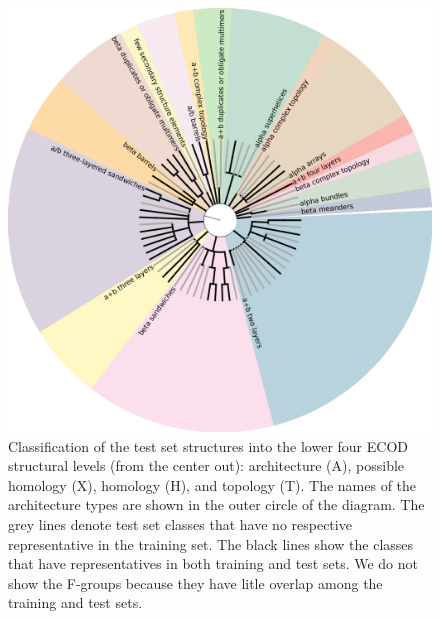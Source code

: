 \begin{figure}[H]
    \centering
    \includegraphics[width=\linewidth]{Fig/folds_graph.png}
%
    \caption{Classification of the test set structures into the lower
    four ECOD structural levels (from the center out): architecture
    (A), possible homology (X), homology (H), and topology (T). The
    names of the architecture types are shown in the outer circle of
    the diagram.
    The grey lines denote test set classes that have no
    respective representative in the training set. The black lines
    show the classes that have representatives in both training and
    test sets. We do not show the F-groups because they have litle
    overlap among the training and test sets.
}
%
    \label{Fig:foldsGraph}
\end{figure}

